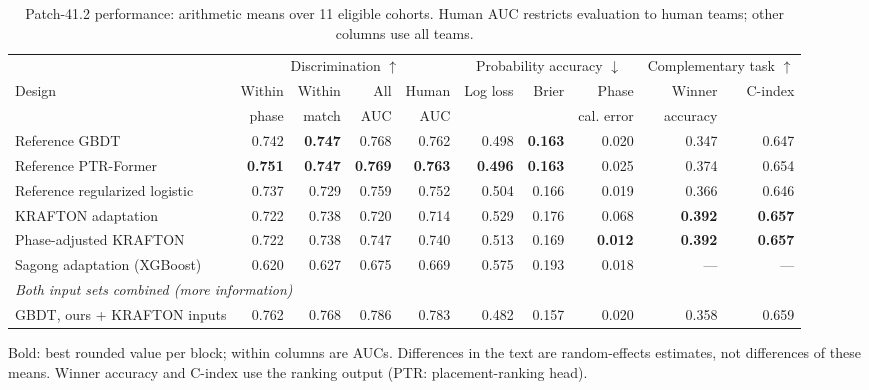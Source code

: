 \begin{table}[t]
\centering\footnotesize
\caption{Patch-41.2 performance: arithmetic means over 11 eligible cohorts. Human AUC restricts evaluation to human teams; other columns use all teams.}
\label{tab:main}
\setlength{\tabcolsep}{2.5pt}
\begin{tabular*}{\textwidth}{@{\extracolsep{\fill}}lrrrrrrrrr@{}}
\toprule
 & \multicolumn{4}{c}{Discrimination $\uparrow$} & \multicolumn{3}{c}{Probability accuracy $\downarrow$} & \multicolumn{2}{c}{Complementary task $\uparrow$} \\
\cmidrule(lr){2-5}\cmidrule(lr){6-8}\cmidrule(lr){9-10}
Design & Within & Within & All & Human & Log loss & Brier & Phase & Winner & C-index \\
 & phase & match & AUC & AUC &  &  & cal. error & accuracy &  \\
\midrule
Reference GBDT & 0.742 & \textbf{0.747} & 0.768 & 0.762 & 0.498 & \textbf{0.163} & 0.020 & 0.347 & 0.647 \\
Reference PTR-Former & \textbf{0.751} & \textbf{0.747} & \textbf{0.769} & \textbf{0.763} & \textbf{0.496} & \textbf{0.163} & 0.025 & 0.374 & 0.654 \\
Reference regularized logistic & 0.737 & 0.729 & 0.759 & 0.752 & 0.504 & 0.166 & 0.019 & 0.366 & 0.646 \\
KRAFTON adaptation & 0.722 & 0.738 & 0.720 & 0.714 & 0.529 & 0.176 & 0.068 & \textbf{0.392} & \textbf{0.657} \\
Phase-adjusted KRAFTON & 0.722 & 0.738 & 0.747 & 0.740 & 0.513 & 0.169 & \textbf{0.012} & \textbf{0.392} & \textbf{0.657} \\
Sagong adaptation (XGBoost) & 0.620 & 0.627 & 0.675 & 0.669 & 0.575 & 0.193 & 0.018 & --- & --- \\
\midrule
\multicolumn{10}{l}{\emph{Both input sets combined (more information)}} \\
GBDT, ours + KRAFTON inputs & 0.762 & 0.768 & 0.786 & 0.783 & 0.482 & 0.157 & 0.020 & 0.358 & 0.659 \\
\bottomrule
\end{tabular*}
\smallskip
\parbox{\textwidth}{\scriptsize Bold: best rounded value per block; within columns are AUCs. Differences in the text are random-effects estimates, not differences of these means. Winner accuracy and C-index use the ranking output (PTR: placement-ranking head).}
\end{table}
